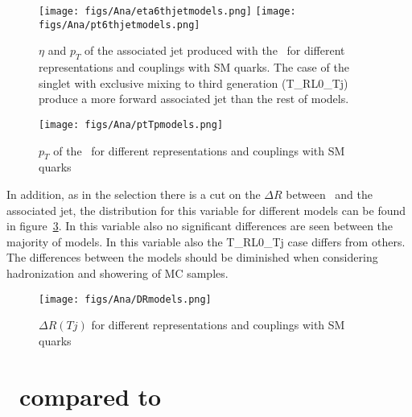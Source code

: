 \begin{figure}[!hbtp]
  \begin{center}
    \texttt{[image: figs/Ana/eta6thjetmodels.png]}
    \texttt{[image: figs/Ana/pt6thjetmodels.png]}
    \caption{$\eta$ and $p_{T}$ of the associated jet produced with the \Tp~for different representations and couplings with SM quarks. The case of the singlet with exclusive mixing to third generation (T\_RL0\_Tj) produce a more forward associated jet than the rest of models.}
    \label{fig:accomjet}
  \end{center}
\end{figure}

\begin{figure}[!hbtp]
  \begin{center}
    \texttt{[image: figs/Ana/ptTpmodels.png]}
    \caption{$p_{T}$ of the \Tp~for different representations and couplings with SM quarks}
    \label{fig:Tppt}
  \end{center}
\end{figure}

In addition, as in the selection there is a cut on the $\Delta R$ between \Tp~and the associated jet, the distribution for this variable for different models can be found in figure~\ref{fig:DRmodels}. In this variable also no significant differences are seen between the majority of models. In this variable also the T\_RL0\_Tj case differs from others. The differences between the models should be diminished when considering hadronization and showering of MC samples.

\begin{figure}[!hbtp]
  \begin{center}
    \texttt{[image: figs/Ana/DRmodels.png]}
    \caption{$\Delta R (Tj)$ for different representations and couplings with SM quarks}
    \label{fig:DRmodels}
  \end{center}
\end{figure}


\section{\Tjj~compared to \Tj}

